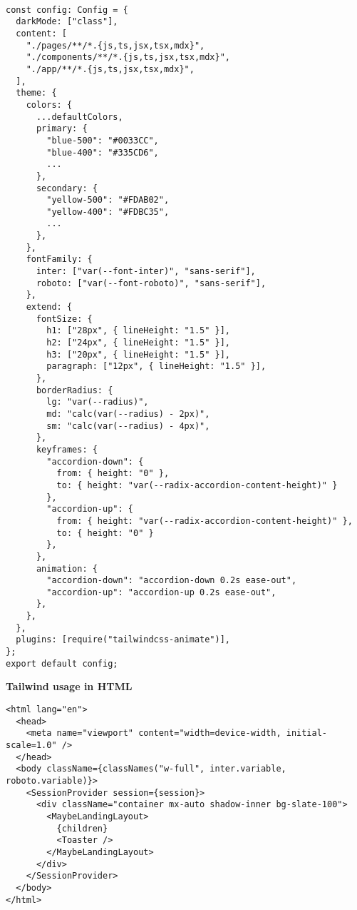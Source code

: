 \begin{verbatim}

const config: Config = {
  darkMode: ["class"],
  content: [
    "./pages/**/*.{js,ts,jsx,tsx,mdx}",
    "./components/**/*.{js,ts,jsx,tsx,mdx}",
    "./app/**/*.{js,ts,jsx,tsx,mdx}",
  ],
  theme: {
    colors: {
      ...defaultColors,
      primary: {
        "blue-500": "#0033CC",
        "blue-400": "#335CD6",
        ...
      },
      secondary: {
        "yellow-500": "#FDAB02",
        "yellow-400": "#FDBC35",
        ...
      },
    },
    fontFamily: {
      inter: ["var(--font-inter)", "sans-serif"],
      roboto: ["var(--font-roboto)", "sans-serif"],
    },
    extend: {
      fontSize: {
        h1: ["28px", { lineHeight: "1.5" }],
        h2: ["24px", { lineHeight: "1.5" }],
        h3: ["20px", { lineHeight: "1.5" }],
        paragraph: ["12px", { lineHeight: "1.5" }],
      },
      borderRadius: {
        lg: "var(--radius)",
        md: "calc(var(--radius) - 2px)",
        sm: "calc(var(--radius) - 4px)",
      },
      keyframes: {
        "accordion-down": {
          from: { height: "0" },
          to: { height: "var(--radix-accordion-content-height)" }
        },
        "accordion-up": {
          from: { height: "var(--radix-accordion-content-height)" },
          to: { height: "0" }
        },
      },
      animation: {
        "accordion-down": "accordion-down 0.2s ease-out",
        "accordion-up": "accordion-up 0.2s ease-out",
      },
    },
  },
  plugins: [require("tailwindcss-animate")],
};
export default config;
\end{verbatim}

\textbf{Tailwind usage in HTML}

\begin{verbatim}
<html lang="en">
  <head>
    <meta name="viewport" content="width=device-width, initial-scale=1.0" />
  </head>
  <body className={classNames("w-full", inter.variable, roboto.variable)}>
    <SessionProvider session={session}>
      <div className="container mx-auto shadow-inner bg-slate-100">
        <MaybeLandingLayout>
          {children}
          <Toaster />
        </MaybeLandingLayout>
      </div>
    </SessionProvider>
  </body>
</html>
\end{verbatim}
